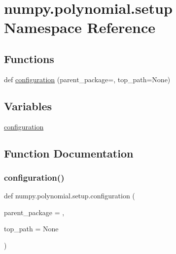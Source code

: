 \hypertarget{namespacenumpy_1_1polynomial_1_1setup}{}\section{numpy.\+polynomial.\+setup Namespace Reference}
\label{namespacenumpy_1_1polynomial_1_1setup}
\subsection*{Functions}
\begin{DoxyCompactItemize}
\item 
def \hyperlink{namespacenumpy_1_1polynomial_1_1setup_a42d923809c912189ac7e7a3d9b97b4e9}{configuration} (parent\+\_\+package=\textquotesingle{}\textquotesingle{}, top\+\_\+path=None)
\end{DoxyCompactItemize}
\subsection*{Variables}
\begin{DoxyCompactItemize}
\item 
\hyperlink{namespacenumpy_1_1polynomial_1_1setup_a2edd2276255d2f46a4ffe6315561850f}{configuration}
\end{DoxyCompactItemize}


\subsection{Function Documentation}
\mbox{\label{namespacenumpy_1_1polynomial_1_1setup_a42d923809c912189ac7e7a3d9b97b4e9}} 
\subsubsection{\texorpdfstring{configuration()}{configuration()}}
{\footnotesize\ttfamily def numpy.\+polynomial.\+setup.\+configuration (\begin{DoxyParamCaption}\item[{}]{parent\+\_\+package = {\ttfamily \textquotesingle{}\textquotesingle{}},  }\item[{}]{top\+\_\+path = {\ttfamily None} }\end{DoxyParamCaption})}



